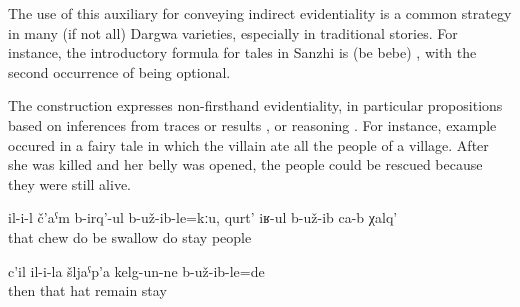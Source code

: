 The use of this auxiliary for conveying indirect evidentiality is a common strategy in many (if not all) Dargwa varieties, especially in traditional stories. For instance, the introductory formula for tales in Sanzhi is  (be  bebe) , with the second occurrence of  being optional.

The construction expresses non-firsthand evidentiality, in particular propositions based on inferences from traces or results ,  or reasoning . For instance, example  occured in a fairy tale in which the villain ate all the people of a village. After she was killed and her belly was opened, the people could be rescued because they were still alive.
%
\begin{exe}
	\ex	\label{ex:(It turned out that) she did not chew the people, but swallowed them@13}
	\gll	il-i-l	č'aˁm	b-irq'-ul	b-už-ib-le=kːu,	qurt' 	iʁ-ul	b-už-ib ca-b	χalq'\\
		that	chew	do	be	swallow	do	stay  people\\
	\glt	{}

	\ex	\label{ex:Then (apparently) his hat remained there@14}
	\gll	c'il	il-i-la	šljaˁp'a	kelg-un-ne	b-už-ib-le=de\\
		then	that	hat	remain	stay\\
	\glt	{}
\end{exe}

